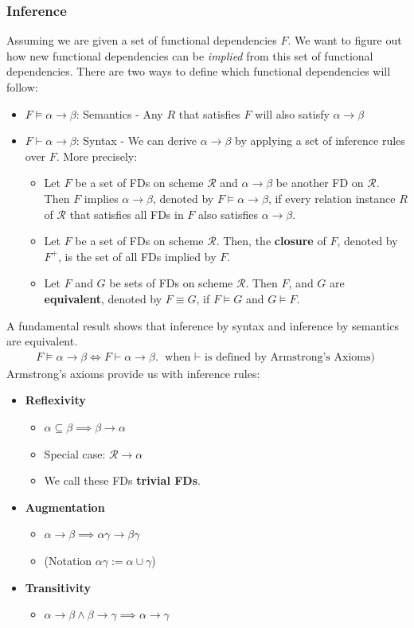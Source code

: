 \subsubsection{Inference}
Assuming we are given a set of functional dependencies $F$. We want to figure out how new functional dependencies can be \textit{implied} from this set of functional dependencies. There are two ways to define which functional dependencies will follow:
\begin{itemize}
\item $F \models \alpha \to \beta$: Semantics - Any $R$ that satisfies $F$ will also satisfy $\alpha \to \beta$
\item $F \vdash \alpha \to \beta$: Syntax - We can derive $\alpha \to \beta$ by applying a set of inference rules over $F$.
More precisely:
\begin{itemize}
\item Let $F$ be a set of FDs on scheme $\mathcal{R}$ and $\alpha \to \beta$ be another FD on $\mathcal{R}$. Then $F$ implies $\alpha \to \beta$, denoted by $F \models \alpha \to \beta$, if every relation instance $R$ of $\mathcal{R}$ that satisfies all FDs in $F$ also satisfies $\alpha \to \beta$.
\item Let $F$ be a set of FDs on scheme $\mathcal{R}$. Then, the \textbf{closure} of $F$, denoted by $F^+$, is the set of all FDs implied by $F$.
\item Let $F$ and $G$ be sets of FDs on scheme $\mathcal{R}$. Then $F$, and $G$ are \textbf{equivalent}, denoted by $F \equiv G$, if $F \models G$ and $G \models F$.
\end{itemize}
\end{itemize}
A fundamental result shows that inference by syntax and inference by semantics are equivalent.
\begin{align*}
F \models \alpha \to \beta \iff F \vdash \alpha \to \beta. \text{ when $\vdash$ is defined by Armstrong's Axioms)}
\end{align*}
Armstrong's axioms provide us with inference rules:
\begin{itemize}
\item \textbf{Reflexivity}
\begin{itemize}
\item $\alpha \subseteq \beta \implies \beta \to \alpha$
\item Special case: $\mathcal{R} \to \alpha$
\item We call these FDs \textbf{trivial FDs}.
\end{itemize}
\item \textbf{Augmentation}
\begin{itemize}
\item $\alpha \to \beta \implies \alpha\gamma \to \beta\gamma$
\item (Notation $\alpha\gamma := \alpha \cup \gamma$)
\end{itemize}
\item \textbf{Transitivity}
\begin{itemize}
\item $\alpha \to \beta \land \beta \to \gamma \implies \alpha \to \gamma$
\end{itemize}
\end{itemize}
